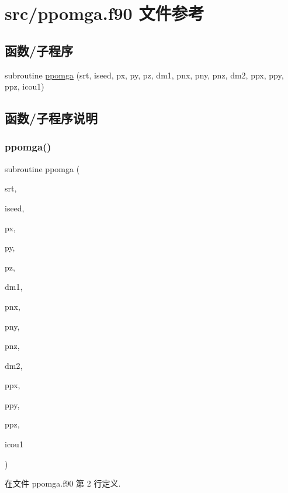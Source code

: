 \hypertarget{ppomga_8f90}{}\section{src/ppomga.f90 文件参考}
\label{ppomga_8f90}
\subsection*{函数/子程序}
\begin{DoxyCompactItemize}
\item 
subroutine \mbox{\hyperlink{ppomga_8f90_a51fc7720dec1c7e86ba7a347b800f49d}{ppomga}} (srt, iseed, px, py, pz, dm1, pnx, pny, pnz, dm2, ppx, ppy, ppz, icou1)
\end{DoxyCompactItemize}


\subsection{函数/子程序说明}
\mbox{\label{ppomga_8f90_a51fc7720dec1c7e86ba7a347b800f49d}} 
\subsubsection{\texorpdfstring{ppomga()}{ppomga()}}
{\footnotesize\ttfamily subroutine ppomga (\begin{DoxyParamCaption}\item[{}]{srt,  }\item[{}]{iseed,  }\item[{}]{px,  }\item[{}]{py,  }\item[{}]{pz,  }\item[{}]{dm1,  }\item[{}]{pnx,  }\item[{}]{pny,  }\item[{}]{pnz,  }\item[{}]{dm2,  }\item[{}]{ppx,  }\item[{}]{ppy,  }\item[{}]{ppz,  }\item[{}]{icou1 }\end{DoxyParamCaption})}



在文件 ppomga.\+f90 第 2 行定义.

